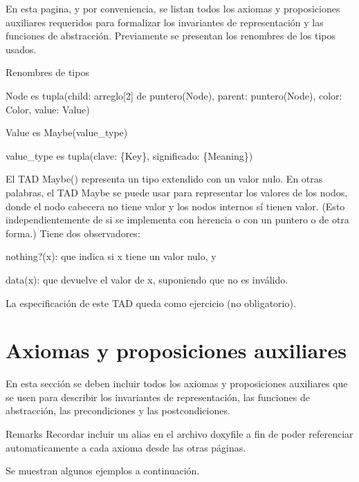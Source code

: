 \-En esta pagina, y por conveniencia, se listan todos los axiomas y proposiciones auxiliares requeridos para formalizar los invariantes de representación y las funciones de abstracción. \-Previamente se presentan los renombres de los tipos usados.

\begin{DoxyParagraph}{\-Renombres de tipos}

\end{DoxyParagraph}

\begin{DoxyItemize}
\item \-Node es tupla(child\-: arreglo\mbox{[}2\mbox{]} de puntero(\-Node), parent\-: puntero(\-Node), color\-: \-Color, value\-: \-Value)
\item \-Value es \-Maybe(value\-\_\-type)
\item value\-\_\-type es tupla(clave\-: \{\-Key\}, significado\-: \{\-Meaning\})
\end{DoxyItemize}

\-El \-T\-A\-D \-Maybe() representa un tipo  extendido con un valor nulo. \-En otras palabras, el \-T\-A\-D \-Maybe se puede usar para representar los valores de los nodos, donde el nodo cabecera no tiene valor y los nodos internos sí tienen valor. (\-Esto independientemente de si se implementa con herencia o con un puntero o de otra forma.) \-Tiene dos observadores\-:
\begin{DoxyItemize}
\item nothing?(x)\-: que indica si x tiene un valor nulo, y
\item data(x)\-: que devuelve el valor de x, suponiendo que no es inválido.
\end{DoxyItemize}

\-La especificación de este \-T\-A\-D queda como ejercicio (no obligatorio).\hypertarget{axiomas_sec-Axiomas}{}\section{\-Axiomas y proposiciones auxiliares}\label{axiomas_sec-Axiomas}
\-En esta sección se deben incluir todos los axiomas y proposiciones auxiliares que se usen para describir los invariantes de representación, las funciones de abstracción, las precondiciones y las postcondiciones.

\begin{DoxyRemark}{\-Remarks}
\-Recordar incluir un alias en el archivo doxyfile a fin de poder referenciar automaticamente a cada axioma desde las otras páginas.
\end{DoxyRemark}
\-Se muestran algunos ejemplos a continuación.


